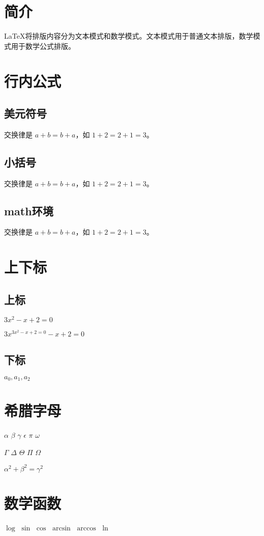 \documentclass{article}
\begin{document}
	\section{简介}
	\LaTeX{}将排版内容分为文本模式和数学模式。文本模式用于普通文本排版，数学模式用于数学公式排版。
	\section{行内公式}
	\subsection{美元符号}
	交换律是 $a+b=b+a$，如 $1+2=2+1=3$。
	\subsection{小括号}
	交换律是 \(a+b=b+a\)，如 \(1+2=2+1=3\)。
	\subsection{math环境}
	交换律是 \begin{math}a+b=b+a\end{math}，如 \begin{math}1+2=2+1=3\end{math}。
	\section{上下标}
	\subsection{上标}
	$3x^2 - x + 2 = 0$
	
	$3x^{3x^2 - x + 2 = 0} - x + 2 = 0$
	\subsection{下标}
	$a_0, a_1, a_2$
	\section{希腊字母}
	$\alpha$
	$\beta$
	$\gamma$
	$\epsilon$
	$\pi$
	$\omega$
	
	$\Gamma$
	$\Delta$
	$\Theta$
	$\Pi$
	$\Omega$
	
	$\alpha^2 + \beta^2 = \gamma^2$
	\section{数学函数}
	$\log$
	$\sin$
	$\cos$
	$\arcsin$
	$\arccos$
	$\ln$
	
\end{document}
